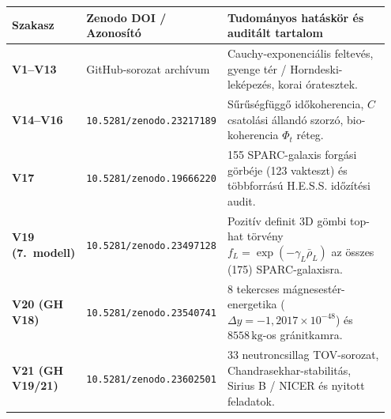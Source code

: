 \documentclass[10pt,a4paper]{article}
\begin{document}
{\vspace{1.5mm}
\begin{center}\vspace{-2pt}
{\footnotesize
\begin{tabular}{@{}>{\bfseries}p{0.15\linewidth}p{0.27\linewidth}p{0.53\linewidth}@{}}
\toprule
Szakasz & Zenodo DOI / Azonos\'it\'o & Tudom\'anyos hat\'ask\"or \'es audit\'alt tartalom \\
\midrule
V1--V13 & GitHub-sorozat arch\'ivum & Cauchy-exponenci\'alis feltev\'es, gyenge t\'er / Horndeski-lek\'epez\'es, korai \'oratesztek. \\
V14--V16 & \texttt{10.5281/zenodo.23217189} & S\H{u}r\H{u}s\'egf\"ugg\H{o} id\H{o}koherencia, $C$ csatol\'asi \'alland\'o szorz\'o, bio-koherencia $\Phi_t$ r\'eteg. \\
V17 & \texttt{10.5281/zenodo.19666220} & 155 SPARC-galaxis forg\'asi g\"orb\'eje (123 vakteszt) \'es t\"obbforr\'as\'u H.E.S.S. id\H{o}z\'it\'esi audit. \\
V19 (7.\ modell) & \texttt{10.5281/zenodo.23497128} & Pozit\'iv definit 3D g\"ombi top-hat t\"orv\'eny $f_L=\exp(-\gamma_L\bar{\rho}_L)$ az \"osszes (175) SPARC-galaxisra. \\
V20 (GH V18) & \texttt{10.5281/zenodo.23540741} & 8 tekercses m\'agnesest\'er-energetika ($\Delta y=-1{,}2017\times 10^{-48}$) \'es $8558\,\text{kg}$-os gr\'anitkamra. \\
V21 (GH V19/21) & \texttt{10.5281/zenodo.23602501} & 33 neutroncsillag TOV-sorozat, Chandrasekhar-stabilit\'as, Sirius B / NICER \'es nyitott feladatok. \\
\bottomrule
\end{tabular}}
\end{center}

}
\end{document}
